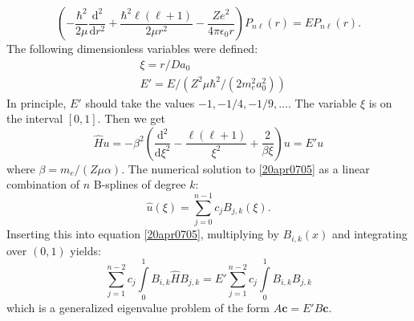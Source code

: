 \documentclass[twocolumn]{article}
\begin{document}
\begin{large}
\begin{equation}
    \left(-\frac{\hbar^2}{2\mu}\frac{\text{d}^2}{\text{d}r^2} + \frac{\hbar^2\ell(\ell+1)}{2\mu r^2} - \frac{Ze^2}{4\pi\epsilon_0r}\right)P_{n\ell}(r) = EP_{n\ell}(r).
\end{equation}
The following dimensionless variables were defined:
\begin{equation}
    \begin{split}
        &\xi = r/Da_0 \\ 
        &E' = E/\left(Z^2\mu\hbar^2/(2m_e^2a_0^2)\right)
    \end{split}
\end{equation}
In principle, $E'$ should take the values $-1,-1/4,-1/9,\dots$. The variable $\xi$ is on the interval $[0,1]$. 
Then we get 
\begin{equation}
    \label{20apr0705}
    \hat{H}u = -\beta^2\left(\frac{\text{d}^2}{\text{d}\xi^2}-\frac{\ell(\ell+1)}{\xi^2}+\frac{2}{\beta\xi}\right)u = E'u
\end{equation}
where $\beta = m_e/(Z\mu\alpha)$. The numerical solution to \eqref{20apr0705} as a linear combination of $n$ B-splines of degree $k$:
\begin{equation}
    \hat{u}(\xi) = \sum_{j=0}^{n-1}c_jB_{j,k}(\xi).
\end{equation}
Inserting this into equation \eqref{20apr0705}, multiplying by $B_{i,k}(x)$ and integrating over $(0,1)$ yields:
\begin{equation}
    \sum_{j=1}^{n-2}c_j\int\limits_0^1B_{i,k}\hat{H}B_{j,k} = E'\sum_{j=1}^{n-2}c_j\int\limits_0^1B_{i,k}B_{j,k}
\end{equation}
which is a generalized eigenvalue problem of the form $A\mathbf{c} = E'B\mathbf{c}$.


















\end{large}
\end{document}
